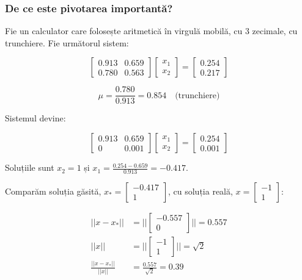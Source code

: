 \documentclass{exam}
\begin{document}
\subsubsection{De ce este pivotarea importantă?}

Fie un calculator care folosește aritmetică în virgulă mobilă, cu 3
zecimale, cu trunchiere. Fie următorul sistem:

\begin{equation*}
	\begin{bmatrix}
		0.913 & 0.659 \\
		0.780 & 0.563
	\end{bmatrix}
	\begin{bmatrix}
		x_1 \\
		x_2
	\end{bmatrix}
	=
	\begin{bmatrix}
		0.254 \\
		0.217
	\end{bmatrix}
\end{equation*}

\begin{equation*}
	\mu = \frac{0.780}{0.913} = 0.854 \quad \text{(trunchiere)}
\end{equation*}

Sistemul devine:

\begin{equation*}
	\begin{bmatrix}
		0.913 & 0.659 \\
		0     & 0.001
	\end{bmatrix}
	\begin{bmatrix}
		x_1 \\
		x_2
	\end{bmatrix}
	=
	\begin{bmatrix}
		0.254 \\
		0.001
	\end{bmatrix}
\end{equation*}

Soluțiile sunt $x_2 = 1$ și $x_1 = \frac{0.254 - 0.659}{0.913} = -0.417$.

Comparăm soluția găsită, $x_* = \begin{bmatrix} -0.417 \\ 1 \end{bmatrix}$,
cu soluția reală, $x = \begin{bmatrix} -1 \\ 1 \end{bmatrix}$:

\begin{align*}
	||x - x_*||               & = ||\begin{bmatrix} -0.557 \\ 0 \end{bmatrix}|| = 0.557 \\
	||x||                     & = ||\begin{bmatrix} -1 \\ 1 \end{bmatrix}|| = \sqrt{2}  \\
	\frac{||x - x_*||}{||x||} & = \frac{0.557}{\sqrt{2}} = 0.39
\end{align*}
\end{document}
